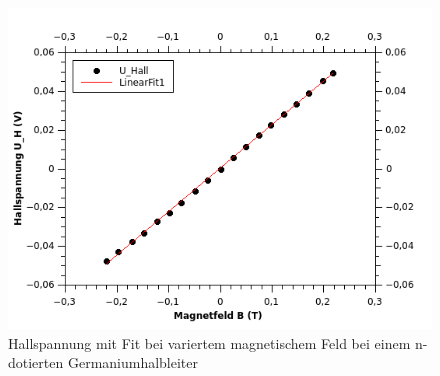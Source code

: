 \documentclass[12pt,a4paper]{article}
\begin{document}
\begin{multicols}{2}



\end{multicols}
\begin{figure}[H]
	\centering
	\includegraphics[scale=1.5]{./figures/Hall_nGe_UH-B.png}
	\caption{Hallspannung mit Fit bei variertem magnetischem Feld bei einem n-dotierten Germaniumhalbleiter}
	\label{fig:nGe_UH_B}
\end{figure}
\end{document}

